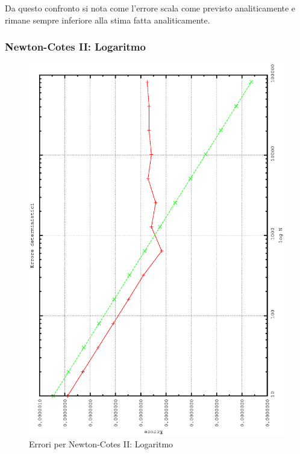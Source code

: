 Da questo confronto si nota come l'errore scala come previsto analiticamente e rimane sempre inferiore alla stima fatta analiticamente.

\subsubsection{Newton-Cotes II: Logaritmo}
\begin{figure}[h]
\includegraphics[width=0.7\columnwidth,angle=-90]{plot_simp_log.eps}
\caption{Errori per Newton-Cotes II: Logaritmo}
\end{figure}

